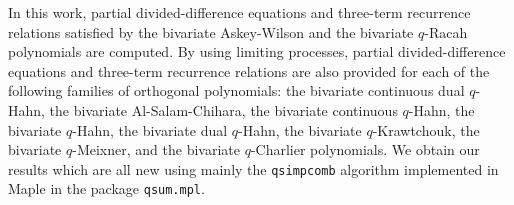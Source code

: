 \documentclass[11pt]{article}
\begin{document}
In this work,  partial divided-difference equations and three-term recurrence relations satisfied by the bivariate Askey-Wilson and the  bivariate $q$-Racah polynomials are computed.  By using limiting processes,  partial divided-difference equations and three-term recurrence relations   are also provided for each of the following families of orthogonal polynomials:  the bivariate continuous dual $q$-Hahn, the bivariate Al-Salam-Chihara, the bivariate continuous $q$-Hahn, the bivariate $q$-Hahn, the bivariate dual $q$-Hahn, the bivariate $q$-Krawtchouk, the bivariate $q$-Meixner, and the bivariate $q$-Charlier polynomials. We obtain our results which are all new using mainly the  \texttt{qsimpcomb} algorithm implemented in Maple in the package \texttt{qsum.mpl}.
%
%
\end{document}
